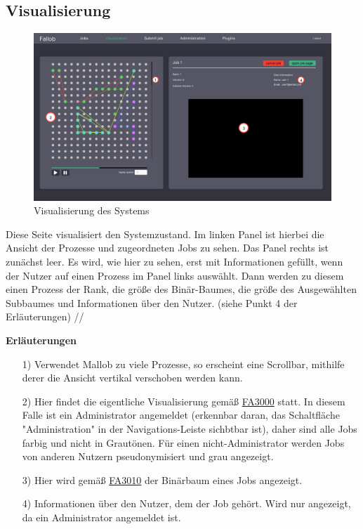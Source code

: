 \subsection{Visualisierung}
\label{pages:visualization}
\begin{figure}[H]
    \centering
    \includegraphics[width=\textwidth]{images-interface/v4_interface/visualization_page_4.pdf}
    \caption{Visualisierung des Systems}
    \label{fig:visualization-page}
\end{figure}
Diese Seite visualisiert den Systemzustand. Im linken Panel ist hierbei die Ansicht der Prozesse und zugeordneten Jobs zu sehen. Das Panel rechts ist zunächst leer. Es wird, wie hier zu sehen, erst mit Informationen gefüllt, wenn der Nutzer auf einen Prozess im Panel links auswählt. Dann werden zu diesem einen Prozess der Rank, die größe des Binär-Baumes, die größe des Ausgewählten Subbaumes und Informationen über den Nutzer. (siehe Punkt 4 der Erläuterungen) //

\textbf{Erläuterungen}
\begin{itemize}
    \item[1)] Verwendet Mallob zu viele Prozesse, so erscheint eine Scrollbar, mithilfe derer die Ansicht vertikal verschoben werden kann.
    \item[2)] Hier findet die eigentliche Visualisierung gemäß \hyperref[FA:Web-Interface:Verifizieren eines Kontos]{FA3000} statt. In diesem Falle ist ein Administrator angemeldet (erkennbar daran, das Schaltfläche "Administration" in der Navigations-Leiste sichbtbar ist), daher sind alle Jobs farbig und nicht in Grautönen. Für einen nicht-Administrator werden Jobs von anderen Nutzern pseudonymisiert und grau angezeigt.
    \item[3)] Hier wird gemäß \hyperref[FA:Visualisierung:Anzeigen des Binaerbaumes für einen Job]{FA3010} der Binärbaum eines Jobs angezeigt.
    \item[4)] Informationen über den Nutzer, dem der Job gehört. Wird nur angezeigt, da ein Administrator angemeldet ist.
\end{itemize}

